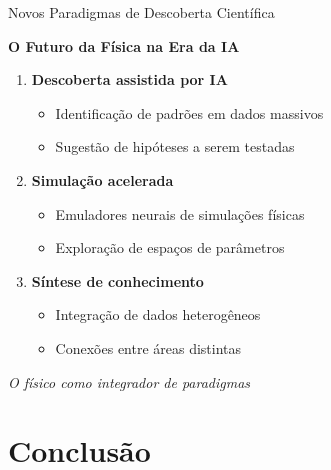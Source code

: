 \documentclass[aspectratio=169,12pt]{beamer}
\begin{document}
\begin{frame}{Novos Paradigmas de Descoberta Científica}
    \begin{center}
        \Large\textbf{O Futuro da Física na Era da IA}
    \end{center}

    \vspace{0.5cm}

    \begin{enumerate}
        \item \textbf{Descoberta assistida por IA}
        \begin{itemize}
            \item Identificação de padrões em dados massivos
            \item Sugestão de hipóteses a serem testadas
        \end{itemize}

        \item \textbf{Simulação acelerada}
        \begin{itemize}
            \item Emuladores neurais de simulações físicas
            \item Exploração de espaços de parâmetros
        \end{itemize}

        \item \textbf{Síntese de conhecimento}
        \begin{itemize}
            \item Integração de dados heterogêneos
            \item Conexões entre áreas distintas
        \end{itemize}
    \end{enumerate}

    \vspace{0.3cm}

    \begin{alertblock}{}
        \centering
        \textit{O físico como integrador de paradigmas}
    \end{alertblock}
\end{frame}

\section{Conclusão}
\end{document}
